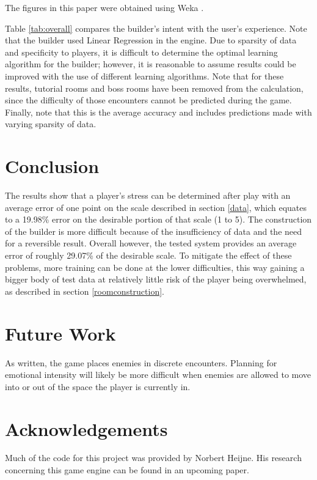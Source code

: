 \documentclass[a4paper]{article}
\begin{document}
\begin{multicols*}{2}
The figures in this paper were obtained using Weka \cite{weka}.

Table \ref{tab:overall} compares the builder's intent with the user's experience. Note that the builder used Linear Regression in the engine.
Due to sparsity of data and specificity to players, it is difficult to determine the optimal learning algorithm for the builder; however, it is reasonable to assume results could be improved with the use of different learning algorithms. 
Note that for these results, tutorial rooms and boss rooms have been removed from the calculation, since the difficulty of those encounters cannot be predicted during the game.
Finally, note that this is the average accuracy and includes predictions made with varying sparsity of data.

\section{Conclusion}
The results show that a player's stress can be determined after play with an average error of one point on the scale described in section \ref{data}, which equates to a 19.98\% error on the desirable portion of that scale (1 to 5).
The construction of the builder is more difficult because of the insufficiency of data and the need for a reversible result. Overall however, the tested system provides an average error of roughly 29.07\% of the desirable scale. 
To mitigate the effect of these problems, more training can be done at the lower difficulties, this way gaining a bigger body of test data at relatively little risk of the player being overwhelmed, as described in section \ref{roomconstruction}.

\section{Future Work}
As written, the game places enemies in discrete encounters. Planning for emotional intensity will likely be more difficult when enemies are allowed to move into or out of the space the player is currently in. 

\section{Acknowledgements}
Much of the code for this project was provided by Norbert Heijne. His research concerning this game engine can be found in an upcoming paper.


\begin{thebibliography}{9}


\end{thebibliography}
\end{multicols*}
\end{document}
